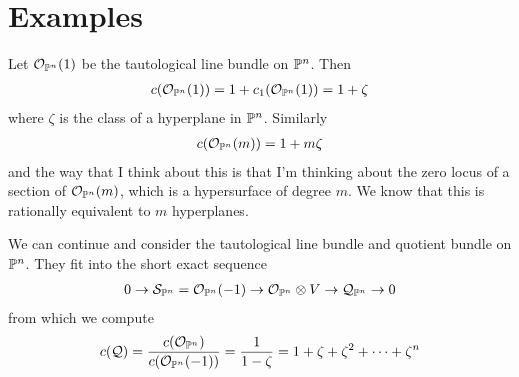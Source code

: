 \documentclass[12pt]{article}
\begin{document}
\section{Examples}
\begin{example}
Let $\cO_{\P^n}(1)$ be the tautological line bundle on $\P^n$. Then \begin{align*}
    c(\cO_{\P^n}(1)) = 1 + c_1(\cO_{\P^n}(1)) = 1 + \zeta
\end{align*} where $\zeta$ is the class of a hyperplane in $\P^n$. Similarly
\begin{align*}
    c(\cO_{\P^n}(m)) = 1 + m\zeta
\end{align*}
and the way that I think about this is that I'm thinking about the zero locus of a section of $\cO_{\P^n}(m)$, which 
is a hypersurface of degree $m$. We know that this is rationally equivalent to $m$ hyperplanes.  

\hfill

We can continue and consider the tautological line bundle and quotient bundle on $\P^n$. They fit into
the short exact sequence \begin{align*}
    0 \to \cS_{\P^n} = \cO_{\P^n}(-1) \to \cO_{\P^n} \otimes V \to \cQ_{\P^n} \to 0
\end{align*} from which we compute \begin{align*}
    c(\cQ) = \frac{c(\cO_{\P^n})}{c(\cO_{\P^n}(-1))} = \frac{1}{1-\zeta} = 1 + \zeta + \zeta^2 + \cdots + \zeta^n
\end{align*}
\end{example}
\end{document}
